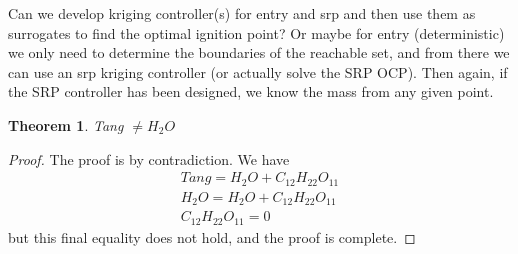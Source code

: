 \documentclass[letterpaper, preprint, paper,11pt]{AAS}	%
\newtheorem{theorem}{Theorem}
\begin{document}
	Can we develop kriging controller(s) for entry and srp and then use them as surrogates to find the optimal ignition point? Or maybe for entry (deterministic) we only need to determine the boundaries of the reachable set, and from there we can use an srp kriging controller (or actually solve the SRP OCP). Then again, if the SRP controller has been designed, we know the mass from any given point. 
	\pagebreak
	
	\begin{theorem}
		Tang $\not= H_2O$
	\end{theorem}
	\begin{proof}
		The proof is by contradiction. We have
		\begin{align}
		Tang = H_2O + C_{12}H_{22}O_{11} \\
		H_2O = H_2O + C_{12}H_{22}O_{11} \\
		C_{12}H_{22}O_{11} = 0
		\end{align}
		but this final equality does not hold, and the proof is complete.
	\end{proof}
		
%	
%	
\end{document}

